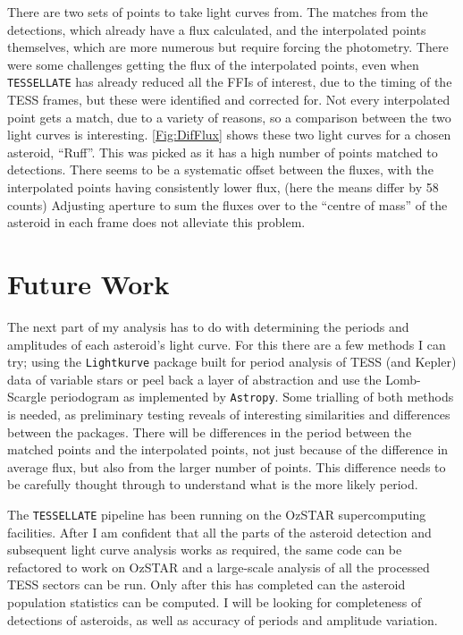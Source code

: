 \documentclass[12pt]{article}
\begin{document}
There are two sets of points to take light curves from. 
The matches from the detections, which already have a flux calculated, and the interpolated points themselves, which are more numerous but require forcing the photometry. 
There were some challenges getting the flux of the interpolated points, even when \texttt{TESSELLATE} has already reduced all the FFIs of interest, due to the timing of the TESS frames, but these were identified and corrected for.
Not every interpolated point gets a match, due to a variety of reasons, %
so a comparison between the two light curves is interesting. 
\autoref{Fig:DifFlux} shows these two light curves for a chosen asteroid, ``Ruff''. 
This was picked as it has a high number of points matched to detections.
There seems to be a systematic offset between the fluxes, with the interpolated points having consistently lower flux, (here the means differ by 58 counts)
Adjusting aperture to sum the fluxes over to the ``centre of mass'' of the asteroid in each frame does not alleviate this problem. 

\section{Future Work}

The next part of my analysis has to do with determining the periods and amplitudes of each asteroid's light curve.
For this there are a few methods I can try; using the \texttt{Lightkurve} \citep{Lightkurve2018} package built for period analysis of TESS (and Kepler) data of variable stars or peel back a layer of abstraction and use the Lomb-Scargle periodogram as implemented by \texttt{Astropy}\cite{Astropy2022}. 
Some trialling of both methods is needed, as preliminary testing reveals of interesting similarities and differences between the packages. 
There will be differences in the period between the matched points and the interpolated points, not just because of the difference in average flux, but also from the larger number of points. This difference needs to be carefully thought through to understand what is the more likely period.


The \texttt{TESSELLATE} pipeline has been running on the OzSTAR supercomputing facilities. 
After I am confident that all the parts of the asteroid detection and subsequent light curve analysis works as required, the same code can be refactored to work on OzSTAR and a large-scale analysis of all the processed TESS sectors can be run. 
Only after this has completed can the asteroid population statistics can be computed. 
I will be looking for completeness of detections of asteroids, as well as accuracy of periods and amplitude variation.
\end{document}
